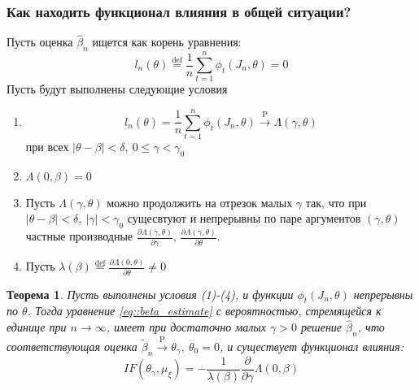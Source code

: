 \documentclass[12pt]{article}
\theoremstyle{basic_theorem}
\newtheorem{theorem}{Теорема}
\theoremstyle{name_theorem}
\newcommand*{\defeq}{\stackrel{\text{def}}{=}}
\def\P{ \mathrm{P} }
\begin{document}
\subsubsection*{Как находить функционал влияния в общей ситуации?}
Пусть оценка $\widehat{\beta}_n$ ищется как корень уравнения:
\begin{equation}\label{eq::beta_estimate}
    l_n(\theta)\defeq \frac{1}{n}\sum_{t=1}^n\phi_t(J_n, \theta)=0
\end{equation}
Пусть будут выполнены следующие условия
\begin{enumerate}
    \item \[l_n(\theta)=\frac{1}{n}\sum_{t=1}^n\phi_t(J_n,\theta)\xrightarrow{\P}\Lambda(\gamma,\theta)\]
        при всех $\lvert\theta-\beta\rvert<\delta,\ 0\leq\gamma<\gamma_0$
    \item $\Lambda(0,\beta)=0$
    \item Пусть $\Lambda(\gamma,\theta)$ можно продолжить на отрезок малых $\gamma$ так,
    что при $\lvert\theta-\beta\rvert<\delta,\ \lvert\gamma\rvert<\gamma_0$ сущесвтуют
    и непрерывны по паре аргументов $(\gamma,\theta)$ частные производные
    $\frac{\partial\Lambda(\gamma,\theta)}{\partial\gamma}$, $\frac{\partial\Lambda(\gamma,\theta)}{\partial\theta}$.
    \item Пусть $\lambda(\beta)\defeq\frac{\partial\Lambda(0,\theta)}{\partial\theta}\neq0$
\end{enumerate}
\begin{theorem} \label{th::M_estimate_sample_median}
    Пусть выполнены условия (1)-(4), и функции $\phi_t(J_n,\theta)$ непрерывны по $\theta$.
    Тогда уравнение \eqref{eq::beta_estimate} с вероятностью, стремящейся к единице при $n\rightarrow\infty$,
    имеет при достаточно малых $\gamma>0$ решение $\widehat{\beta}_n$, что соответствующая
    оценка $\widetilde{\beta}_n\xrightarrow{\P}\theta_\gamma,\ \theta_0=0$, и существует
    функционал влияния:
    \[\boxed{IF(\theta_\gamma,\mu_\xi)=-\frac{1}{\lambda(\beta)}\frac{\partial}{\partial\gamma}\Lambda(0,\beta)}\]
\end{theorem}
\end{document}
